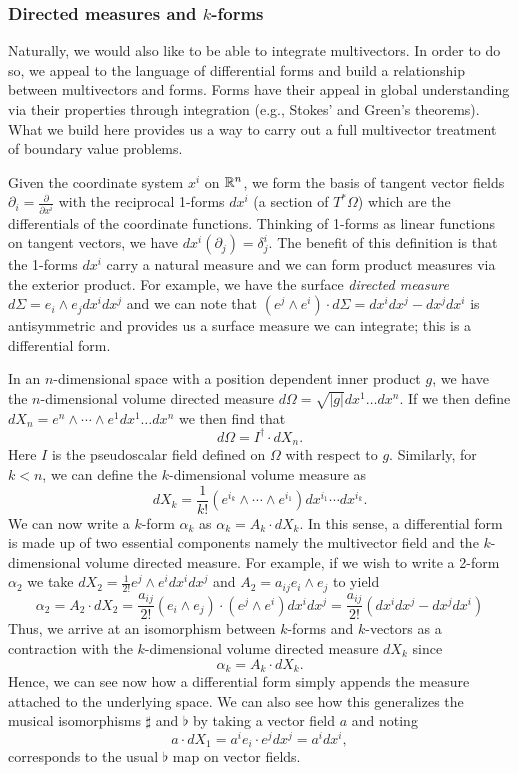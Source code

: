 \subsubsection{Directed measures and $k$-forms}
Naturally, we would also like to be able to integrate multivectors.  In order to do so, we appeal to the language of differential forms and build a relationship between multivectors and forms. Forms have their appeal in global understanding via their properties through integration (e.g., Stokes' and Green's theorems).  What we build here provides us a way to carry out a full multivector treatment of boundary value problems.

Given the coordinate system $x^i$ on $\mathbb{R}^n$, we form the basis of tangent vector fields $\partial_i = \frac{\partial}{\partial x^i}$ with the reciprocal 1-forms $dx^i$ (a section of $T^*\Omega$) which are the differentials of the coordinate functions.  Thinking of 1-forms as linear functions on tangent vectors, we have $dx^i  (\partial_j) = \delta^i_j$.  The benefit of this definition is that the 1-forms $dx^i$ carry a natural measure and we can form product measures via the exterior product.  For example, we have the surface \emph{directed measure} $d\Sigma = e_i \wedge e_j dx^i dx^j$ and we can note that $(e^j \wedge e^i)\cdot d\Sigma = dx^idx^j - dx^j dx^i$ is antisymmetric and provides us a surface measure we can integrate; this is a differential form.

In an $n$-dimensional space with a position dependent inner product $g$, we have the $n$-dimensional volume directed measure $d\Omega = \sqrt{|g|} dx^1\dots dx^n$. If we then define $dX_n = e^n \wedge \cdots \wedge e^1 dx^1 \dots dx^n$ we then find that
\[
d\Omega = I^\dagger \cdot dX_n.
\]
Here $I$ is the pseudoscalar field defined on $\Omega$ with respect to $g$. Similarly, for $k<n$, we can define the $k$-dimensional volume measure as 
\[
dX_k = \frac{1}{k!}(e^{i_k}\wedge \cdots \wedge e^{i_1}) dx^{i_1} \cdots dx^{i_k}.
\]
We can now write a $k$-form $\alpha_k$ as $\alpha_k = A_k \cdot dX_k$. In this sense, a differential form is made up of two essential components namely the multivector field and the $k$-dimensional volume directed measure. For example, if we wish to write a 2-form $\alpha_2$ we take $dX_2 = \frac{1}{2!} e^j \wedge e^i dx^i dx^j$ and $A_2 = a_{ij} e_i \wedge e_j$ to yield
\[
\alpha_2 = A_2 \cdot dX_2 = \frac{a_{ij}}{2!} (e_i \wedge e_j) \cdot (e^j \wedge e^i) dx^i dx^j = \frac{a_{ij}}{2!} (dx^i dx^j - dx^j dx^i)
\]
Thus, we arrive at an isomorphism between $k$-forms and $k$-vectors as a contraction with the $k$-dimensional volume directed measure $dX_k$ since
\[
\alpha_k = A_k \cdot dX_k.
\]
Hence, we can see now how a differential form simply appends the measure attached to the underlying space. We can also see how this generalizes the musical isomorphisms $\sharp$ and $\flat$ by taking a vector field $a$ and noting
\begin{equation}
\label{eq:line_element}
a \cdot dX_1 = a^i e_i \cdot e^j dx^j = a^i dx^i,
\end{equation}
corresponds to the usual $\flat$ map on vector fields.


